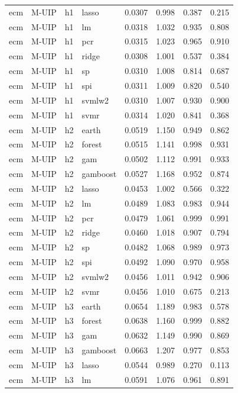 \begin{ThreePartTable}
\begin{longtable}[t]{llclcccc}
ecm & M-UIP & h1 & lasso & 0.0307 & 0.998 & 0.387 & 0.215\\
ecm & M-UIP & h1 & lm & 0.0318 & 1.032 & 0.935 & 0.808\\
ecm & M-UIP & h1 & pcr & 0.0315 & 1.023 & 0.965 & 0.910\\
ecm & M-UIP & h1 & ridge & 0.0308 & 1.001 & 0.537 & 0.384\\
ecm & M-UIP & h1 & sp & 0.0310 & 1.008 & 0.814 & 0.687\\
ecm & M-UIP & h1 & spi & 0.0311 & 1.009 & 0.820 & 0.540\\
ecm & M-UIP & h1 & svmlw2 & 0.0310 & 1.007 & 0.930 & 0.900\\
ecm & M-UIP & h1 & svmr & 0.0314 & 1.020 & 0.841 & 0.368\\
\addlinespace
ecm & M-UIP & h2 & earth & 0.0519 & 1.150 & 0.949 & 0.862\\
ecm & M-UIP & h2 & forest & 0.0515 & 1.141 & 0.998 & 0.931\\
ecm & M-UIP & h2 & gam & 0.0502 & 1.112 & 0.991 & 0.933\\
ecm & M-UIP & h2 & gamboost & 0.0527 & 1.168 & 0.952 & 0.874\\
ecm & M-UIP & h2 & lasso & 0.0453 & 1.002 & 0.566 & 0.322\\
ecm & M-UIP & h2 & lm & 0.0489 & 1.083 & 0.983 & 0.944\\
ecm & M-UIP & h2 & pcr & 0.0479 & 1.061 & 0.999 & 0.991\\
ecm & M-UIP & h2 & ridge & 0.0460 & 1.018 & 0.907 & 0.794\\
ecm & M-UIP & h2 & sp & 0.0482 & 1.068 & 0.989 & 0.973\\
ecm & M-UIP & h2 & spi & 0.0492 & 1.090 & 0.970 & 0.958\\
ecm & M-UIP & h2 & svmlw2 & 0.0456 & 1.011 & 0.942 & 0.906\\
ecm & M-UIP & h2 & svmr & 0.0456 & 1.010 & 0.675 & 0.213\\
\addlinespace
ecm & M-UIP & h3 & earth & 0.0654 & 1.189 & 0.983 & 0.578\\
ecm & M-UIP & h3 & forest & 0.0638 & 1.160 & 0.999 & 0.882\\
ecm & M-UIP & h3 & gam & 0.0632 & 1.149 & 0.990 & 0.869\\
ecm & M-UIP & h3 & gamboost & 0.0663 & 1.207 & 0.977 & 0.853\\
ecm & M-UIP & h3 & lasso & 0.0544 & 0.989 & 0.270 & 0.113\\
ecm & M-UIP & h3 & lm & 0.0591 & 1.076 & 0.961 & 0.891\\

\end{longtable}
\end{ThreePartTable}
